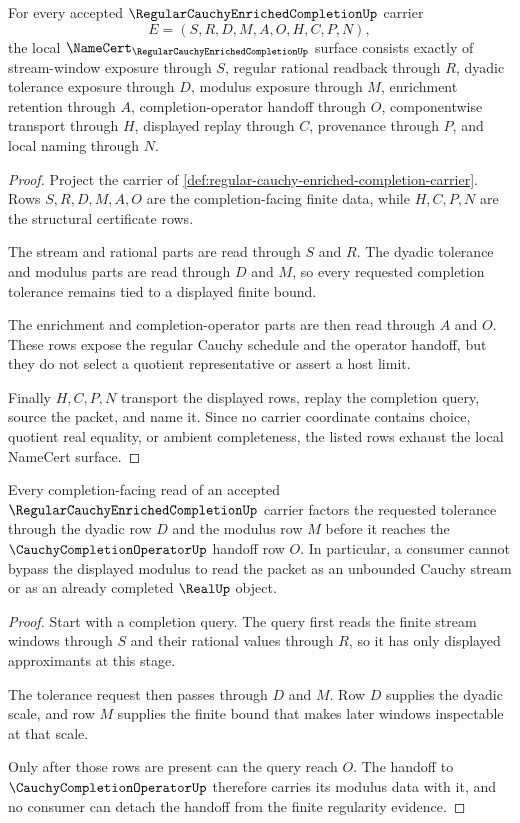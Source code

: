\begin{theorem}
\label{thm:regular-cauchy-enriched-completion-namecert-obligations}
For every accepted $\RegularCauchyEnrichedCompletionUp$ carrier
$$
E=(S,R,D,M,A,O,H,C,P,N),
$$
the local $\NameCert_{\RegularCauchyEnrichedCompletionUp}$ surface consists exactly of stream-window exposure through $S$, regular rational readback through $R$, dyadic tolerance exposure through $D$, modulus exposure through $M$, enrichment retention through $A$, completion-operator handoff through $O$, componentwise transport through $H$, displayed replay through $C$, provenance through $P$, and local naming through $N$.
\end{theorem}
\begin{proof}
Project the carrier of \autoref{def:regular-cauchy-enriched-completion-carrier}. Rows $S,R,D,M,A,O$ are the completion-facing finite data, while $H,C,P,N$ are the structural certificate rows.

The stream and rational parts are read through $S$ and $R$. The dyadic tolerance and modulus parts are read through $D$ and $M$, so every requested completion tolerance remains tied to a displayed finite bound.

The enrichment and completion-operator parts are then read through $A$ and $O$. These rows expose the regular Cauchy schedule and the operator handoff, but they do not select a quotient representative or assert a host limit.

Finally $H,C,P,N$ transport the displayed rows, replay the completion query, source the packet, and name it. Since no carrier coordinate contains choice, quotient real equality, or ambient completeness, the listed rows exhaust the local NameCert surface.
\end{proof}

\begin{theorem}
\label{thm:regular-cauchy-enriched-completion-modulus-handoff}
Every completion-facing read of an accepted $\RegularCauchyEnrichedCompletionUp$ carrier factors the requested tolerance through the dyadic row $D$ and the modulus row $M$ before it reaches the $\CauchyCompletionOperatorUp$ handoff row $O$. In particular, a consumer cannot bypass the displayed modulus to read the packet as an unbounded Cauchy stream or as an already completed $\RealUp$ object.
\end{theorem}
\begin{proof}
Start with a completion query. The query first reads the finite stream windows through $S$ and their rational values through $R$, so it has only displayed approximants at this stage.

The tolerance request then passes through $D$ and $M$. Row $D$ supplies the dyadic scale, and row $M$ supplies the finite bound that makes later windows inspectable at that scale.

Only after those rows are present can the query reach $O$. The handoff to $\CauchyCompletionOperatorUp$ therefore carries its modulus data with it, and no consumer can detach the handoff from the finite regularity evidence.
\end{proof}

